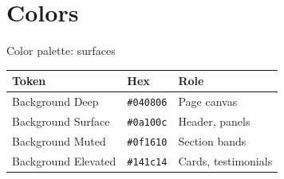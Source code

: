 \documentclass[aspectratio=169,10pt]{beamer}
\begin{document}
\section{Colors}

\begin{frame}{Color palette: surfaces}

  \vspace{0.6em}
  \begin{tabular}{@{}lll@{}}
    \toprule
    \textbf{Token} & \textbf{Hex} & \textbf{Role} \\
    \midrule
    Background Deep & \texttt{\#040806} & Page canvas \\
    Background Surface & \texttt{\#0a100c} & Header, panels \\
    Background Muted & \texttt{\#0f1610} & Section bands \\
    Background Elevated & \texttt{\#141c14} & Cards, testimonials \\
    \bottomrule
  \end{tabular}

  \vspace{0.8em}
  \begin{columns}[c,onlytextwidth]
    \centering\colorbox{collinsDeep}{\rule{0pt}{1.4cm}\rule{1.8cm}{0pt}}
    \centering\colorbox{collinsSurface}{\rule{0pt}{1.4cm}\rule{1.8cm}{0pt}}
    \centering\colorbox{collinsMuted}{\rule{0pt}{1.4cm}\rule{1.8cm}{0pt}}
    \centering\colorbox{collinsElevated}{\rule{0pt}{1.4cm}\rule{1.8cm}{0pt}}
  \end{columns}
\end{frame}
\end{document}
